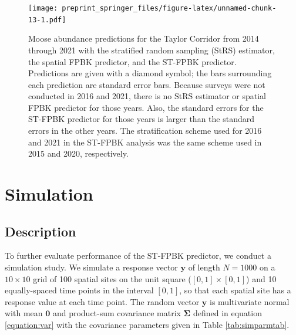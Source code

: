 \documentclass[smallextended]{svjour3}       %
\begin{document}
\begin{figure}
\centering
\texttt{[image: preprint\_springer\_files/figure-latex/unnamed-chunk-13-1.pdf]}
\caption{\label{fig:trend} Moose abundance predictions for the Taylor
Corridor from 2014 through 2021 with the stratified random sampling
(StRS) estimator, the spatial FPBK predictor, and the ST-FPBK predictor.
Predictions are given with a diamond symbol; the bars surrounding each
prediction are standard error bars. Because surveys were not conducted
in 2016 and 2021, there is no StRS estimator or spatial FPBK predictor
for those years. Also, the standard errors for the ST-FPBK predictor for
those years is larger than the standard errors in the other years. The
stratification scheme used for 2016 and 2021 in the ST-FPBK analysis was
the same scheme used in 2015 and 2020, respectively.}
\end{figure}

\hypertarget{section:Simulation}{%
\section{Simulation}\label{section:Simulation}}

\hypertarget{description}{%
\subsection{Description}\label{description}}

To further evaluate performance of the ST-FPBK predictor, we conduct a
simulation study. We simulate a response vector \(\mathbf{y}\) of length
\(N = 1000\) on a \(10 \times 10\) grid of 100 spatial sites on the unit
square (\([0, 1] \times [0, 1]\)) and 10 equally-spaced time points in
the interval \([0, 1]\), so that each spatial site has a response value
at each time point. The random vector \(\mathbf{y}\) is multivariate
normal with mean \(\mathbf{0}\) and product-sum covariance matrix
\(\bm{\Sigma}\) defined in equation \ref{equation:var} with the
covariance parameters given in Table \ref{tab:simparmtab}.
\end{document}
